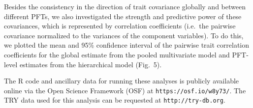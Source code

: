 Besides the consistency in the direction of trait covariance globally and between different PFTs, we also investigated the strength and predictive power of these covariances, which is represented by correlation coefficients (i.e.\ the pairwise covariance normalized to the variances of the component variables).
To do this, we plotted the mean and 95\% confidence interval of the pairwise trait correlation coefficients for the global estimate from the pooled multivariate model and PFT-level estimates from the hierarchical model (Fig.\ 5).

The R code and ancillary data for running these analyses is publicly available online via the Open Science Framework (OSF) at \texttt{https://osf.io/w8y73/}.
The TRY data used for this analysis can be requested at \texttt{http://try-db.org}.
